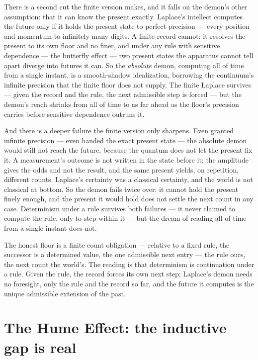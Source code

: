 There is a second cut the finite version makes, and it falls on the demon's other assumption: that it can know
the present exactly. Laplace's intellect computes the future only if it holds the present state to perfect
precision --- every position and momentum to infinitely many digits. A finite record cannot: it resolves the
present to its own floor and no finer, and under any rule with sensitive dependence --- the butterfly effect
--- two present states the apparatus cannot tell apart diverge into futures it can. So the
\emph{absolute} demon, computing all of time from a single instant, is a smooth-shadow idealization, borrowing
the continuum's infinite precision that the finite floor does not supply. The finite Laplace survives --- given
the record and the rule, the next admissible step is forced --- but the demon's reach shrinks from all of time
to as far ahead as the floor's precision carries before sensitive dependence outruns it.

And there is a deeper failure the finite version only sharpens. Even granted infinite precision --- even handed
the exact present state --- the absolute demon would still not reach the future, because the quantum does not
let the present fix it. A measurement's outcome is not written in the state before it; the amplitude gives the
odds and not the result, and the same present yields, on repetition, different counts. Laplace's certainty was
a classical certainty, and the world is not classical at bottom. So the demon fails twice over: it cannot hold
the present finely enough, and the present it would hold does not settle the next count in any case.
Determinism under a rule survives both failures --- it never claimed to compute the rule, only to step within
it --- but the dream of reading all of time from a single instant does not.

The honest floor is a finite count obligation --- relative to a fixed rule, the successor is a determined
value, the one admissible next entry --- the rule ours, the next count the world's. The reading is that
determinism is continuation under a rule. Given the
rule, the record forces its own next step; Laplace's demon needs no foresight, only the rule and the record so
far, and the future it computes is the unique admissible extension of the past.

\section{The Hume Effect: the inductive gap is real}
\label{se:hume}

